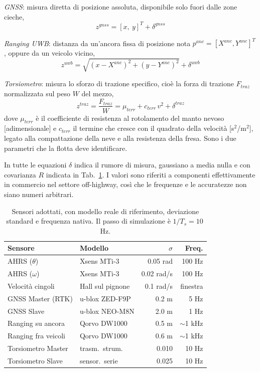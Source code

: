\documentclass[conference,9pt]{IEEEtran}
\begin{document}
\emph{GNSS}: misura diretta di posizione assoluta, disponibile solo fuori dalle
zone cieche, 
\begin{equation}
z^{gnss} = [x,\ y]^T + \delta^{gnss}
\end{equation}

\emph{Ranging UWB}: distanza da un'ancora fissa di posizione nota
$p^{anc} = [X^{anc}, Y^{anc}]^T$, oppure da un veicolo vicino,
\begin{equation}
z^{uwb} = \sqrt{(x - X^{anc})^2 + (y - Y^{anc})^2} + \delta^{uwb}
\label{eq:uwb}
\end{equation}

\emph{Torsiometro}: misura lo sforzo di trazione specifico, cio\`e la forza
di trazione $F_{traz}$ normalizzata sul peso $W$ del mezzo,
\begin{equation}
z^{traz} = \frac{F_{traz}}{W} = \mu_{terr} + c_{terr}\,v^2 + \delta^{traz}
\label{eq:traz}
\end{equation}
dove $\mu_{terr}$ \`e il coefficiente di resistenza al rotolamento del manto
nevoso [adimensionale] e $c_{terr}$ il termine che cresce con il quadrato della
velocit\`a [s$^2$/m$^2$], legato alla compattazione della neve e alla
resistenza della fresa. Sono i due parametri che la flotta deve identificare.

In tutte le equazioni $\delta$ indica il rumore di misura, gaussiano a media
nulla e con covarianza $R$ indicata in Tab.~\ref{tab:sensori}. I valori sono
riferiti a componenti effettivamente in commercio nel settore off-highway,
cos\`i che le frequenze e le accuratezze non siano numeri arbitrari.

\begin{table}[t]
\centering
\caption{Sensori adottati, con modello reale di riferimento, deviazione
standard e frequenza nativa. Il passo di simulazione \`e $1/T_s = 10$\,Hz.}
\label{tab:sensori}
\begin{tabular}{llrr}
\toprule
\textbf{Sensore} & \textbf{Modello} & $\sigma$ & \textbf{Freq.}\\
\midrule
AHRS ($\theta$)      & Xsens MTi-3      & 0.05 rad     & 100 Hz\\
AHRS ($\omega$)      & Xsens MTi-3      & 0.02 rad/s   & 100 Hz\\
Velocit\`a cingoli   & Hall sul pignone & 0.1 rad/s    & finestra\\
GNSS Master (RTK)    & u-blox ZED-F9P   & 0.2 m        & 5 Hz\\
GNSS Slave           & u-blox NEO-M8N   & 2.0 m        & 1 Hz\\
Ranging su ancora    & Qorvo DW1000     & 0.5 m        & $\sim$1 kHz\\
Ranging fra veicoli  & Qorvo DW1000     & 0.6 m        & $\sim$1 kHz\\
Torsiometro Master   & trasm.\ strum.   & 0.010        & 10 Hz\\
Torsiometro Slave    & sensor.\ serie   & 0.025        & 10 Hz\\
\bottomrule
\end{tabular}
\end{table}
\end{document}
